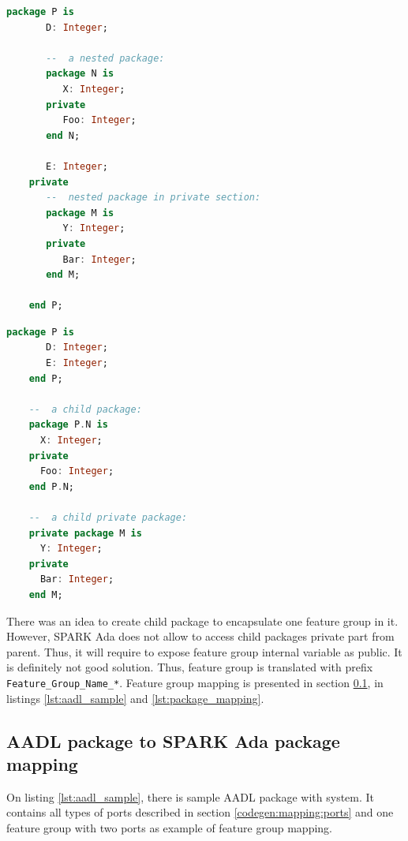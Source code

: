 \singlespacing
\begin{lstlisting}[language=ada, frame=single, gobble=0, caption={Nested packages in SPARK Ada}, label={lst:nested_packages}]
	package P is
	   D: Integer;

	   --  a nested package:
	   package N is
	      X: Integer;
	   private
	      Foo: Integer;
	   end N;

	   E: Integer;
	private
	   --  nested package in private section:
	   package M is
	      Y: Integer;
	   private
	      Bar: Integer;
	   end M;

	end P;
\end{lstlisting}
\doublespacing

\singlespacing
\begin{lstlisting}[language=ada, frame=single, gobble=0, caption={Child packages in SPARK Ada}, label={lst:child_packages}]
	package P is
	   D: Integer;
	   E: Integer;
	end P;

	--  a child package:
	package P.N is
      X: Integer;
   	private
      Foo: Integer;
	end P.N;

	--  a child private package:
	private package M is
	  Y: Integer;
	private
	  Bar: Integer;
	end M;
\end{lstlisting}
\doublespacing

There was an idea to create child package to encapsulate one feature group in it. However, SPARK Ada does not allow to access child packages private part from parent. Thus, it will require to expose feature group internal variable as public. It is definitely not good solution. Thus, feature group is translated with prefix \lstinline{Feature_Group_Name_*}. Feature group mapping is presented in section \ref{codegen:mapping:packages}, in listings \ref{lst:aadl_sample} and \ref{lst:package_mapping}.


\subsection{AADL package to SPARK Ada package mapping}
\label{codegen:mapping:packages}

On listing \ref{lst:aadl_sample}, there is sample AADL package with system. It contains all types of ports described in section \ref{codegen:mapping:ports} and one feature group with two ports as example of feature group mapping.


